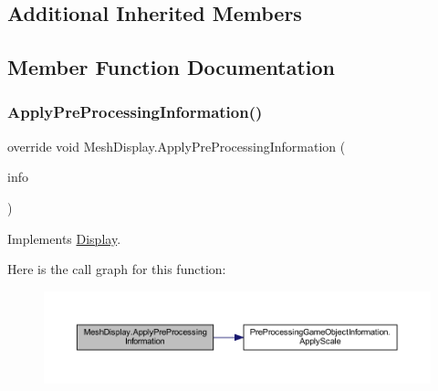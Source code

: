 \subsection*{Additional Inherited Members}


\subsection{Member Function Documentation}
\mbox{\label{class_mesh_display_ab52b4d43c963b3bef383e2eebd1e4115}} 
\subsubsection{\texorpdfstring{Apply\+Pre\+Processing\+Information()}{ApplyPreProcessingInformation()}}
{\footnotesize\ttfamily override void Mesh\+Display.\+Apply\+Pre\+Processing\+Information (\begin{DoxyParamCaption}\item[{\mbox{\hyperlink{class_pre_processing_game_object_information}{Pre\+Processing\+Game\+Object\+Information}}}]{info }\end{DoxyParamCaption})\hspace{0.3cm}{\ttfamily [virtual]}}



Implements \mbox{\hyperlink{class_display_ab9cd24c11c43dd87bc50e85a8e9e4c31}{Display}}.

Here is the call graph for this function\+:
\nopagebreak
\begin{figure}[H]
\begin{center}
\leavevmode
\includegraphics[width=350pt]{class_mesh_display_ab52b4d43c963b3bef383e2eebd1e4115_cgraph}
\end{center}
\end{figure}
\mbox{\label{class_mesh_display_ab9a24f407a8ff995658097a98242095e}} 
